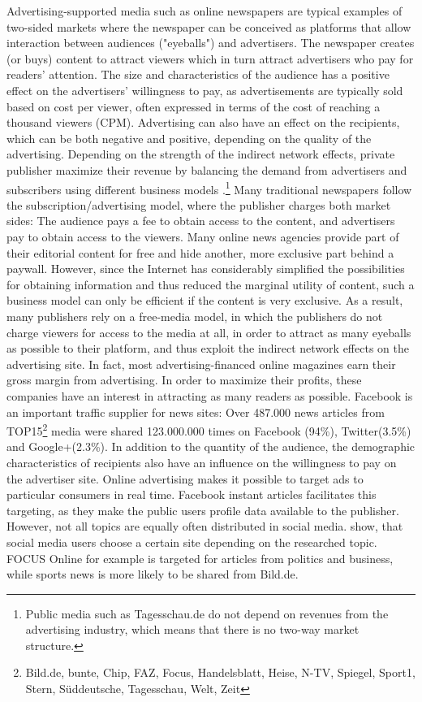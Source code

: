 \documentclass[12pt,a4paper,notitlepage]{article}
\begin{document}
Advertising-supported media such as online newspapers are typical examples of two-sided markets where the newspaper can be conceived as platforms that allow interaction between audiences ("eyeballs") and advertisers. The newspaper creates (or buys) content to attract viewers which in turn attract advertisers who pay for readers' attention.\cite{evans_industrial_2005} The size and characteristics of the audience has a positive effect on the advertisers' willingness to pay, as advertisements are typically sold based on cost per viewer, often expressed in terms of the cost of reaching a thousand viewers (CPM). Advertising can also have an effect on the recipients, which can be both negative and positive, depending on the quality of the advertising. Depending on the strength of the indirect network effects, private publisher maximize their revenue by balancing the demand from advertisers and subscribers using different business models \citep{evans_economics_2008}.\footnote{Public media such as Tagesschau.de do not depend on revenues from the advertising industry, which means that there is no two-way market structure.} Many traditional newspapers follow the subscription/advertising model, where the publisher charges both market sides: The audience pays a fee to obtain access to the content, and advertisers pay to obtain access to the viewers. Many online news agencies provide part of their editorial content for free and hide another, more exclusive part behind a paywall. However, since the Internet has considerably simplified the possibilities for obtaining information and thus reduced the marginal utility of content, such a business model can only be efficient if the content is very exclusive. As a result, many publishers rely on a free-media model, in which the publishers do not charge viewers for access to the media at all, in order to attract as many eyeballs as possible to their platform, and thus exploit the indirect network effects on the advertising site. In fact, most advertising-financed online magazines earn their gross margin from advertising.\cite{evans_industrial_2005} In order to maximize their profits, these companies have an interest in attracting as many readers as possible. Facebook is an important traffic supplier for news sites: Over 487.000 news articles from TOP15\footnote{Bild.de, bunte, Chip, FAZ, Focus, Handelsblatt, Heise, N-TV, Spiegel, Sport1, Stern, Süddeutsche, Tagesschau, Welt, Zeit} media were shared 123.000.000 times on Facebook (94\%), Twitter(3.5\%) and Google+(2.3\%).\cite{schiller_development_2016} In addition to the quantity of the audience, the demographic characteristics of recipients also have an influence on the willingness to pay on the advertiser site. Online advertising makes it possible to target ads to particular consumers in real time. Facebook instant articles facilitates this targeting, as they make the public users profile data available to the publisher. However, not all topics are equally often distributed in social media. \citet{schiller_development_2016} show, that social media users choose a certain site depending on the researched topic. FOCUS Online for example is targeted for articles from politics and business, while sports news is more likely to be shared from Bild.de. 
\end{document}
